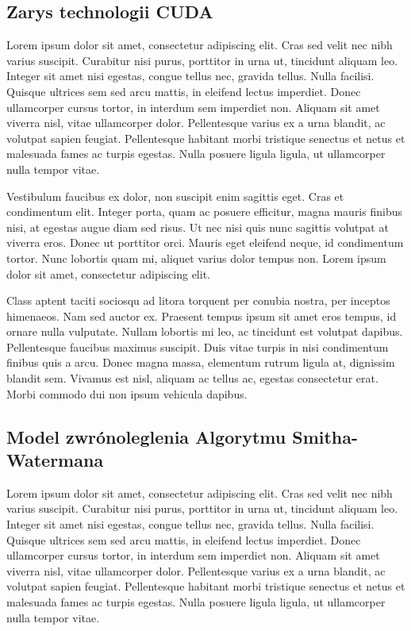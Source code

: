 \documentclass[a4paper,12pt]{article}
\begin{document}
\subsection*{Zarys technologii CUDA}
Lorem ipsum dolor sit amet, consectetur adipiscing elit. Cras sed velit nec nibh varius suscipit. Curabitur nisi purus, porttitor in urna ut, tincidunt aliquam leo. Integer sit amet nisi egestas, congue tellus nec, gravida tellus. Nulla facilisi. Quisque ultrices sem sed arcu mattis, in eleifend lectus imperdiet. Donec ullamcorper cursus tortor, in interdum sem imperdiet non. Aliquam sit amet viverra nisl, vitae ullamcorper dolor. Pellentesque varius ex a urna blandit, ac volutpat sapien feugiat. Pellentesque habitant morbi tristique senectus et netus et malesuada fames ac turpis egestas. Nulla posuere ligula ligula, ut ullamcorper nulla tempor vitae.

Vestibulum faucibus ex dolor, non suscipit enim sagittis eget. Cras et condimentum elit. Integer porta, quam ac posuere efficitur, magna mauris finibus nisi, at egestas augue diam sed risus. Ut nec nisi quis nunc sagittis volutpat at viverra eros. Donec ut porttitor orci. Mauris eget eleifend neque, id condimentum tortor. Nunc lobortis quam mi, aliquet varius dolor tempus non. Lorem ipsum dolor sit amet, consectetur adipiscing elit.

Class aptent taciti sociosqu ad litora torquent per conubia nostra, per inceptos himenaeos. Nam sed auctor ex. Praesent tempus ipsum sit amet eros tempus, id ornare nulla vulputate. Nullam lobortis mi leo, ac tincidunt est volutpat dapibus. Pellentesque faucibus maximus suscipit. Duis vitae turpis in nisi condimentum finibus quis a arcu. Donec magna massa, elementum rutrum ligula at, dignissim blandit sem. Vivamus est nisl, aliquam ac tellus ac, egestas consectetur erat. Morbi commodo dui non ipsum vehicula dapibus.
\subsection*{Model zwrónoleglenia Algorytmu Smitha-Watermana}
Lorem ipsum dolor sit amet, consectetur adipiscing elit. Cras sed velit nec nibh varius suscipit. Curabitur nisi purus, porttitor in urna ut, tincidunt aliquam leo. Integer sit amet nisi egestas, congue tellus nec, gravida tellus. Nulla facilisi. Quisque ultrices sem sed arcu mattis, in eleifend lectus imperdiet. Donec ullamcorper cursus tortor, in interdum sem imperdiet non. Aliquam sit amet viverra nisl, vitae ullamcorper dolor. Pellentesque varius ex a urna blandit, ac volutpat sapien feugiat. Pellentesque habitant morbi tristique senectus et netus et malesuada fames ac turpis egestas. Nulla posuere ligula ligula, ut ullamcorper nulla tempor vitae.
\end{document}
